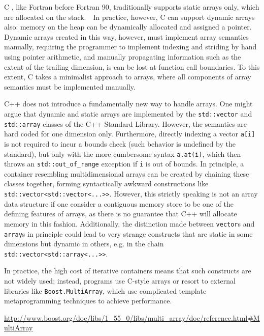 \documentclass[preprint]{sigplanconf}
\newcommand{\code}[1]{\texttt{#1}}
\begin{document}
C \cite{Kernigham:1978cp}, like Fortran before Fortran 90, traditionally supports static arrays only, which are allocated on the stack.　In practice, however, C can support dynamic arrays also: memory on the heap can be dynamically allocated and assigned a pointer. Dynamic arrays created in this way, however, must implement array semantics manually, requiring the programmer to implement indexing and striding by hand using pointer arithmetic, and manually propagating information such as the extent of the trailing dimension, is can be lost at function call boundaries. To this extent, C takes a minimalist approach to arrays, where all components of array semantics must be implemented manually.


C++ does not introduce a fundamentally new way to handle arrays. One might argue that dynamic and static arrays are implemented by the \code{std::vector} and \code{std::array} classes of the C++ Standard Library. However, the semantics are hard coded for one dimension only. Furthermore, directly indexing a vector \code{a[i]} is not required to incur a bounds check (such behavior is undefined by the standard), but only with the more cumbersome syntax \code{a.at(i)}, which then throws an \code{std::out\_of\_range} exception if \code{i} is out of bounds. In principle, a container resembling multidimensional arrays can be created by chaining these classes together, forming syntactically awkward constructions like \code{std::vector<std::vector<...>>}. However, this strictly speaking is not an array data structure if one consider a contiguous memory store to be one of the defining features of arrays, as there is no guarantee that C++ will allocate memory in this fashion. Additionally, the distinction made between \code{vector}s and \code{array}s in principle could lead to very strange constructs that are static in some dimensions but dynamic in others, e.g. in the chain \code{std::vector<std::array<...>>}.

In practice, the high cost of iterative containers means that such constructs are not widely used; instead, programs use C-style arrays or resort to external libraries like \code{Boost.MultiArray}, which use complicated template metaprogramming techniques to achieve performance.

\url{http://www.boost.org/doc/libs/1_55_0/libs/multi_array/doc/reference.html#MultiArray}
\end{document}
